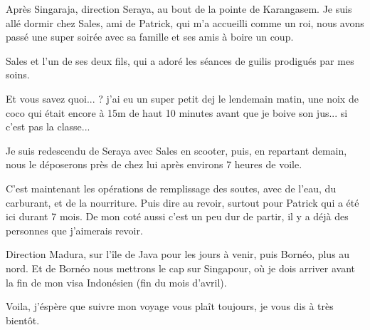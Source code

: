 \begin{multicols}{2}
Après Singaraja, direction Seraya, au bout de la pointe de Karangasem. Je suis allé dormir chez Sales, ami de Patrick, qui m'a accueilli comme un roi, nous avons passé une super soirée avec sa famille et ses amis à boire un coup.

Sales et l'un de ses deux fils, qui a adoré les séances de guilis prodigués par mes soins.


Et vous savez quoi... ? j'ai eu un super petit dej le lendemain matin, une noix de coco qui était encore à 15m de haut 10 minutes avant que je boive son jus... si c'est pas la classe...



Je suis redescendu de Seraya avec Sales en scooter, puis, en repartant demain, nous le déposerons près de chez lui après environs 7 heures de voile.

C'est maintenant les opérations de remplissage des soutes, avec de l'eau, du carburant, et de la nourriture. Puis dire au revoir, surtout pour Patrick qui a été ici durant 7 mois. De mon coté aussi c'est un peu dur de partir, il y a déjà des personnes que j'aimerais revoir.

Direction Madura, sur l'île de Java pour les jours à venir, puis Bornéo, plus au nord. Et de Bornéo nous mettrons le cap sur Singapour, où je dois arriver avant la fin de mon visa Indonésien (fin du mois d'avril).

Voila, j'éspère que suivre mon voyage vous plaît toujours, je vous dis à très bientôt.

\end{multicols}


